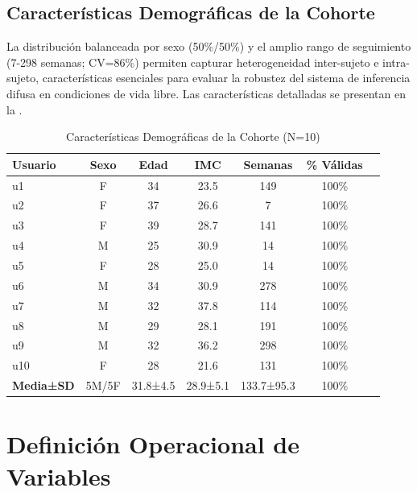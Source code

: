 \subsection{Características Demográficas de la Cohorte}
\label{subsec:caracteristicas_cohorte}

La distribución balanceada por sexo (50\%/50\%) y el amplio rango de seguimiento (7-298 semanas; CV=86\%) permiten capturar heterogeneidad inter-sujeto e intra-sujeto, características esenciales para evaluar la robustez del sistema de inferencia difusa en condiciones de vida libre. Las características detalladas se presentan en la .

\begin{table}[htbp]
\centering
\caption{Características Demográficas de la Cohorte (N=10)}
\label{tab:cohorte_caracteristicas}
\small
\begin{tabular}{@{}lcccccc@{}}
\toprule
\textbf{Usuario} & \textbf{Sexo} & \textbf{Edad} & \textbf{IMC} & \textbf{Semanas} & \textbf{\% Válidas} \\
\midrule
u1 & F & 34 & 23.5 & 149 & 100\% \\
u2 & F & 37 & 26.6 & 7   & 100\% \\
u3 & F & 39 & 28.7 & 141 & 100\% \\
u4 & M & 25 & 30.9 & 14  & 100\% \\
u5 & F & 28 & 25.0 & 14  & 100\% \\
u6 & M & 34 & 30.9 & 278 & 100\% \\
u7 & M & 32 & 37.8 & 114 & 100\% \\
u8 & M & 29 & 28.1 & 191 & 100\% \\
u9 & M & 32 & 36.2 & 298 & 100\% \\
u10 & F & 28 & 21.6 & 131 & 100\% \\
\midrule
\textbf{Media±SD} & 5M/5F & 31.8±4.5 & 28.9±5.1 & 133.7±95.3 & 100\% \\
\bottomrule
\end{tabular}
\end{table}

\section{Definición Operacional de Variables}
\label{sec:definicion_operacional_variables}

